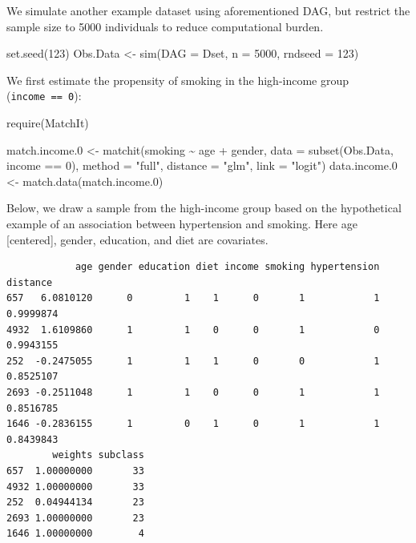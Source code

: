 \documentclass[
  letterpaper,
  DIV=11,
  numbers=noendperiod]{scrreprt}
\newenvironment{Shaded}{\begin{snugshade}}{\end{snugshade}}
\newcommand{\AttributeTok}[1]{\textcolor[rgb]{0.40,0.45,0.13}{#1}}
\newcommand{\DecValTok}[1]{\textcolor[rgb]{0.68,0.00,0.00}{#1}}
\newcommand{\FloatTok}[1]{\textcolor[rgb]{0.68,0.00,0.00}{#1}}
\newcommand{\FunctionTok}[1]{\textcolor[rgb]{0.28,0.35,0.67}{#1}}
\newcommand{\NormalTok}[1]{\textcolor[rgb]{0.00,0.23,0.31}{#1}}
\newcommand{\OtherTok}[1]{\textcolor[rgb]{0.00,0.23,0.31}{#1}}
\newcommand{\SpecialCharTok}[1]{\textcolor[rgb]{0.37,0.37,0.37}{#1}}
\newcommand{\StringTok}[1]{\textcolor[rgb]{0.13,0.47,0.30}{#1}}
\begin{document}
We simulate another example dataset using aforementioned DAG, but
restrict the sample size to 5000 individuals to reduce computational
burden.

\begin{Shaded}
\begin{Highlighting}[]
\FunctionTok{set.seed}\NormalTok{(}\DecValTok{123}\NormalTok{)}
\NormalTok{Obs.Data }\OtherTok{\textless{}{-}} \FunctionTok{sim}\NormalTok{(}\AttributeTok{DAG =}\NormalTok{ Dset, }\AttributeTok{n =} \DecValTok{5000}\NormalTok{, }\AttributeTok{rndseed =} \DecValTok{123}\NormalTok{)}
\end{Highlighting}
\end{Shaded}

We first estimate the propensity of smoking in the high-income group
(\texttt{income\ ==\ 0}):

\begin{Shaded}
\begin{Highlighting}[]
\FunctionTok{require}\NormalTok{(MatchIt)}

\NormalTok{match.income}\FloatTok{.0} \OtherTok{\textless{}{-}} \FunctionTok{matchit}\NormalTok{(smoking }\SpecialCharTok{\textasciitilde{}}\NormalTok{ age }\SpecialCharTok{+}\NormalTok{ gender, }
                          \AttributeTok{data =} \FunctionTok{subset}\NormalTok{(Obs.Data, income }\SpecialCharTok{==} \DecValTok{0}\NormalTok{),}
                          \AttributeTok{method =} \StringTok{"full"}\NormalTok{, }\AttributeTok{distance =} \StringTok{"glm"}\NormalTok{, }\AttributeTok{link =} \StringTok{"logit"}\NormalTok{)}
\NormalTok{data.income}\FloatTok{.0} \OtherTok{\textless{}{-}} \FunctionTok{match.data}\NormalTok{(match.income}\FloatTok{.0}\NormalTok{)}
\end{Highlighting}
\end{Shaded}

Below, we draw a sample from the high-income group based on the
hypothetical example of an association between hypertension and smoking.
Here age {[}centered{]}, gender, education, and diet are covariates.

\begin{verbatim}
            age gender education diet income smoking hypertension  distance
657   6.0810120      0         1    1      0       1            1 0.9999874
4932  1.6109860      1         1    0      0       1            0 0.9943155
252  -0.2475055      1         1    1      0       0            1 0.8525107
2693 -0.2511048      1         1    0      0       1            1 0.8516785
1646 -0.2836155      1         0    1      0       1            1 0.8439843
        weights subclass
657  1.00000000       33
4932 1.00000000       33
252  0.04944134       23
2693 1.00000000       23
1646 1.00000000        4
\end{verbatim}
\end{document}
